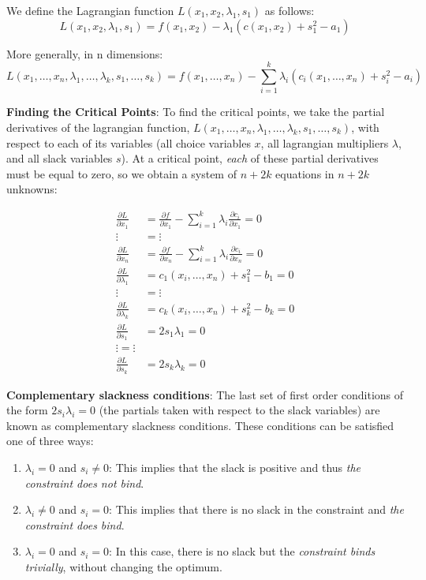 \documentclass[]{book}
\providecommand{\tightlist}{%
  \setlength{\itemsep}{0pt}\setlength{\parskip}{0pt}}
\theoremstyle{definition}
\theoremstyle{definition}
\theoremstyle{definition}
\theoremstyle{remark}
\begin{document}
We define the Lagrangian function \(L(x_1,x_2,\lambda_1,s_1)\) as follows:
\[L(x_1,x_2,\lambda_1,s_1) = f(x_1,x_2) - \lambda_1 ( c(x_1,x_2) + s_1^2 - a_1)\]

More generally, in n dimensions:
\[ L(x_1, \dots, x_n, \lambda_1, \dots, \lambda_k, s_1, \dots, s_k) = f(x_1, \dots, x_n) - \sum_{i = 1}^k \lambda_i(c_i(x_1,\dots, x_n) + s_i^2 - a_i)\]

\textbf{Finding the Critical Points}: To find the critical points, we take the partial derivatives of the lagrangian function, \(L(x_1,\dots,x_n,\lambda_1,\dots,\lambda_k,s_1,\dots,s_k)\), with respect to each of its variables (all choice variables \(x\), all lagrangian multipliers \(\lambda\), and all slack variables \(s\)). At a critical point, \emph{each} of these partial derivatives must be equal to zero, so we obtain a system of \(n + 2k\) equations in \(n + 2k\) unknowns:

\begin{align*}
\frac{\partial L}{\partial x_1} &= \frac{\partial f}{\partial x_1} - \sum_{i = 1}^k\lambda_i\frac{\partial c_i}{\partial x_1} = 0\\
 \vdots & =  \vdots  \\
\frac{\partial L}{\partial x_n}  &= \frac{\partial f}{\partial x_n} - \sum_{i = 1}^k\lambda_i\frac{\partial c_i}{\partial x_n} = 0\\
\frac{\partial L}{\partial \lambda_1} &= c_1(x_i, \dots, x_n) + s_1^2 - b_1 = 0\\
 \vdots & = \vdots \\
\frac{\partial L}{\partial \lambda_k} &= c_k(x_i, \dots, x_n) + s_k^2 - b_k = 0\\
\frac{\partial L}{\partial s_1} &= 2s_1\lambda_1 = 0\\
 \vdots =\vdots \\
\frac{\partial L}{\partial s_k} &= 2s_k\lambda_k = 0
\end{align*}

\textbf{Complementary slackness conditions}: The last set of first order conditions of the form \(2s_i\lambda_i = 0\) (the partials taken with respect to the slack variables) are known as complementary slackness conditions. These conditions can be satisfied one of three ways:

\begin{enumerate}
\def\labelenumi{\arabic{enumi}.}
\tightlist
\item
  \(\lambda_i = 0\) and \(s_i \neq 0\): This implies that the slack is positive and thus \emph{the constraint does not bind}.
\item
  \(\lambda_i \neq 0\) and \(s_i = 0\): This implies that there is no slack in the constraint and \emph{the constraint does bind}.
\item
  \(\lambda_i = 0\) and \(s_i = 0\): In this case, there is no slack but the \emph{constraint binds trivially}, without changing the optimum.
\end{enumerate}
\end{document}
